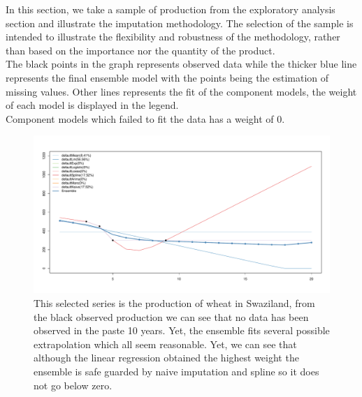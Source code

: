 \documentclass[nojss]{jss}\usepackage[]{graphicx}\usepackage[]{color}
\makeatletter
\def\maxwidth{ %
  \ifdim\Gin@nat@width>\linewidth
    \linewidth
  \else
    \Gin@nat@width
  \fi
}
\newenvironment{knitrout}{}{} %
\makeatother
\begin{document}
In this section, we take a sample of production from the exploratory
analysis section and illustrate the imputation methodology. The
selection of the sample is intended to illustrate the flexibility and
robustness of the methodology, rather than based on the importance nor
the quantity of the product.\\

The black points in the graph represents observed data while the
thicker blue line represents the final ensemble model with the points
being the estimation of missing values. Other lines represents the fit
of the component models, the weight of each model is displayed in the
legend.\\

Component models which failed to fit the data has a weight of 0.\\

\begin{knitrout}
\color{fgcolor}\begin{figure}[!ht]


{\centering \includegraphics[width=\maxwidth]{figure/wheat-swaziland-impute} 

}

\caption[This selected series is the production of wheat in Swaziland, from the black observed production we can see that no data has been observed in the paste 10 years]{This selected series is the production of wheat in Swaziland, from the black observed production we can see that no data has been observed in the paste 10 years. Yet, the ensemble fits several possible extrapolation which all seem reasonable. Yet, we can see that although the linear regression obtained the highest weight the ensemble is safe guarded by naive imputation and spline so it does not go below zero.\label{fig:wheat-swaziland-impute}}
\end{figure}


\end{knitrout}
\end{document}
